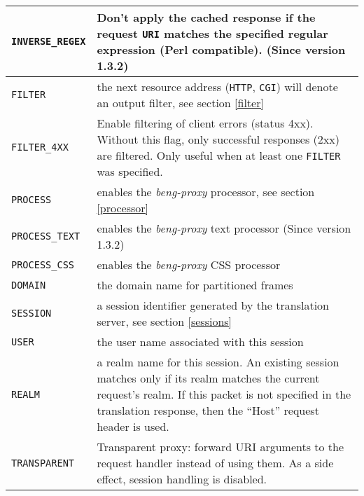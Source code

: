 \documentclass[a4paper,12pt]{article}
\begin{document}
\begin{longtable}{|l|p{8cm}|}
\hline

\verb|INVERSE_REGEX| & Don't apply the cached response if the request
\verb|URI| matches the specified regular expression (Perl
compatible). \scriptsize{(Since version 1.3.2)} \\

\hline

\verb|FILTER| & the next resource address (\verb|HTTP|,
\verb|CGI|) will denote an output filter, see section \ref{filter}
\\

\hline

\verb|FILTER_4XX| & Enable filtering of client errors (status 4xx).
Without this flag, only successful responses (2xx) are filtered.  Only
useful when at least one \verb|FILTER| was specified. \\

\hline

\verb|PROCESS| & enables the \emph{beng-proxy} processor, see
section \ref{processor} \\

\hline

\verb|PROCESS_TEXT| & enables the \emph{beng-proxy} text processor
\scriptsize{(Since version 1.3.2)} \\

\hline

\verb|PROCESS_CSS| & enables the \emph{beng-proxy} CSS processor \\

\hline

\verb|DOMAIN| & the domain name for partitioned frames \\

\hline

\verb|SESSION| & a session identifier generated by the translation
server, see section \ref{sessions} \\

\hline

\verb|USER| & the user name associated with this session \\

\hline

\verb|REALM| & a realm name for this session.  An existing session
matches only if its realm matches the current request's realm.  If
this packet is not specified in the translation response, then the
``Host'' request header is used. \\

\hline

\verb|TRANSPARENT| & Transparent proxy: forward URI arguments to the
request handler instead of using them.  As a side effect, session
handling is disabled. \\


\end{longtable}
\end{document}
